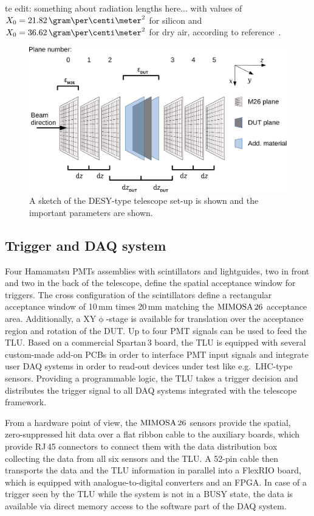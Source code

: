 te edit: something about radiation lengths here...
\label{sec:radiationlengths}
with values of $X_0 = 21.82\,\allowbreak\gram\per\centi\meter^2$ for silicon and $X_0 = 36.62\,\gram\per\centi\meter^2$ for dry air, according to reference~\cite{ref:x0values}.


\begin{figure}[tb]
	\center
	\includegraphics[width=.9\textwidth]{figures/sketch_tscope4}
	\caption[A sketch of the DESY-type telescope set-up]{A sketch of the DESY-type telescope set-up is shown and the important parameters are shown.}
	\label{fig:datura_sketch}
\end{figure}

\subsection{Trigger and DAQ system}

Four Hamamatsu PMTs assemblies with scintillators and lightguides, two in front and two in the back of the telescope, define the spatial acceptance window for triggers. 
The cross configuration of the scintillators define a rectangular acceptance window of 10\,mm times 20\,mm matching the $\textrm{MIMOSA\,26}$ acceptance area. 
Additionally, a XY$\upphi$-stage is available for translation over the acceptance region and rotation of the DUT. 
Up to four PMT signals can be used to feed the TLU. 
Based on a commercial Spartan\,3 board, the TLU is equipped with several custom-made add-on PCBs in order to interface PMT input signals
 and integrate user DAQ systems in order to read-out devices under test like e.g.~LHC-type sensors. 
Providing a programmable logic, the TLU  takes a trigger decision and distributes the trigger signal to all DAQ systems integrated with the telescope framework.

From a hardware point of view, the $\textrm{MIMOSA\,26}$ sensors provide the spatial, zero-suppressed hit data over a flat ribbon cable to the auxiliary boards, which provide RJ\,45 connectors to connect them with the
 data distribution box collecting the data from all six sensors and the TLU. 
A 52-pin cable then transports the data and the TLU information in parallel into a FlexRIO board, which is equipped with analogue-to-digital converters and an FPGA. 
In case of a trigger seen by the TLU while the system is not in a BUSY state, the data is available via direct memory access to the software part of the DAQ system. 

